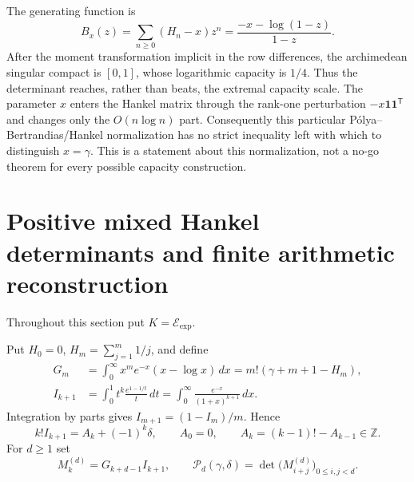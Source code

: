 \documentclass[11pt]{article}
\theoremstyle{definition}
\theoremstyle{remark}
\newcommand{\Eexp}{\mathcal E_{\mathrm{exp}}}
\begin{document}
The generating function is
\begin{equation}\label{eq:harmonic-gen}
 B_x(z)=\sum_{n\ge0}(H_n-x)z^n
 =\frac{-x-\log(1-z)}{1-z}.
\end{equation}
After the moment transformation implicit in the row differences, the
archimedean singular compact is \([0,1]\), whose logarithmic capacity is
\(1/4\).  Thus the determinant reaches, rather than beats, the extremal
capacity scale.  The parameter \(x\) enters the Hankel matrix through the
rank-one perturbation \(-x\mathbf1\mathbf1^{\mathsf T}\) and changes only
the \(O(n\log n)\) part.  Consequently this particular
P\'olya--Bertrandias/Hankel normalization has no strict inequality left with
which to distinguish \(x=\gamma\).  This is a statement about this
normalization, not a no-go theorem for every possible capacity construction.

\section{Positive mixed Hankel determinants and finite arithmetic reconstruction}
\label{sec:positive-mixed-hankel}

Throughout this section put $K=\Eexp$.

Put $H_0=0$, $H_m=\sum_{j=1}^m1/j$, and define
\begin{align}
 G_m
 &=\int_0^\infty x^me^{-x}(x-\log x)\,dx
   =m!(\gamma+m+1-H_m),
 \label{eq:mixed-G-moment}\\
 I_{k+1}
 &=\int_0^1t^k\frac{e^{1-1/t}}t\,dt
   =\int_0^\infty\frac{e^{-x}}{(1+x)^{k+1}}\,dx.
 \label{eq:mixed-I-moment}
\end{align}
Integration by parts gives $I_{m+1}=(1-I_m)/m$.  Hence
\begin{equation}\label{eq:mixed-I-arithmetic}
 k!I_{k+1}=A_k+(-1)^k\delta,
 \qquad A_0=0,
 \qquad A_k=(k-1)!-A_{k-1}\in\mathbb Z.
\end{equation}
For $d\geq1$ set
\begin{equation}\label{eq:mixed-Hankel-definition}
 M_k^{(d)}=G_{k+d-1}I_{k+1},
 \qquad
 \mathcal P_d(\gamma,\delta)
 =\det\bigl(M_{i+j}^{(d)}\bigr)_{0\leq i,j<d}.
\end{equation}
\end{document}
